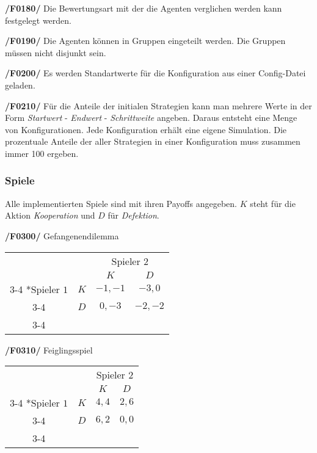 \textbf{/F0180/} 
Die Bewertungsart mit der die Agenten verglichen werden kann festgelegt werden.

\textbf{/F0190/} 
Die Agenten können in Gruppen eingeteilt werden. Die Gruppen müssen nicht disjunkt sein.

\textbf{/F0200/} 
Es werden Standartwerte für die Konfiguration aus einer Config-Datei geladen.

\textbf{/F0210/} 
Für die Anteile der initialen Strategien kann man mehrere Werte in der Form \emph{Startwert} - \emph{Endwert} - \emph{Schrittweite} angeben. Daraus entsteht eine Menge von Konfigurationen. Jede Konfiguration erhält eine eigene Simulation. Die prozentuale Anteile der aller Strategien in einer Konfiguration muss zusammen immer 100 ergeben. 

\subsubsection{Spiele}
Alle implementierten Spiele sind mit ihren Payoffs angegeben. $K$ steht für die Aktion \emph{Kooperation} und $D$ für \emph{Defektion}.

\textbf{/F0300/} 
Gefangenendilemma
\begin{table}[H]
\centering
\setlength{\extrarowheight}{2pt}
\begin{tabular}{cc|c|c|}
  & \multicolumn{1}{c}{} & \multicolumn{2}{c}{Spieler $2$} \\
  & \multicolumn{1}{c}{} & \multicolumn{1}{c}{$K$} & \multicolumn{1}{c}{$D$} \\\cline{3-4}
  \multirow{2}*{Spieler $1$} & $K$ & $-1,-1$ & $-3,0$ \\\cline{3-4} 
  & $D$ & $0,-3$ & $-2,-2$ \\\cline{3-4}
\end{tabular}
\end{table}

\textbf{/F0310/} 
Feiglingsspiel
\begin{table}[H]
\centering
\setlength{\extrarowheight}{2pt}
\begin{tabular}{cc|c|c|}
  & \multicolumn{1}{c}{} & \multicolumn{2}{c}{Spieler $2$} \\
  & \multicolumn{1}{c}{} & \multicolumn{1}{c}{$K$} & \multicolumn{1}{c}{$D$} \\\cline{3-4}
  \multirow{2}*{Spieler $1$} & $K$ & $4,4$ & $2,6$ \\\cline{3-4} 
  & $D$ & $6,2$ & $0,0$ \\\cline{3-4}
\end{tabular}
\end{table}

